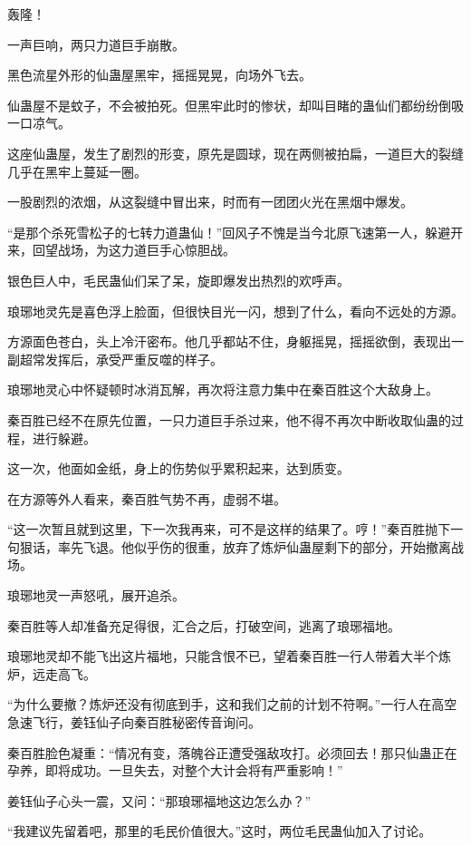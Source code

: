 \begin{this_body}
轰隆！

一声巨响，两只力道巨手崩散。

黑色流星外形的仙蛊屋黑牢，摇摇晃晃，向场外飞去。

仙蛊屋不是蚊子，不会被拍死。但黑牢此时的惨状，却叫目睹的蛊仙们都纷纷倒吸一口凉气。

这座仙蛊屋，发生了剧烈的形变，原先是圆球，现在两侧被拍扁，一道巨大的裂缝几乎在黑牢上蔓延一圈。

一股剧烈的浓烟，从这裂缝中冒出来，时而有一团团火光在黑烟中爆发。

“是那个杀死雪松子的七转力道蛊仙！”回风子不愧是当今北原飞速第一人，躲避开来，回望战场，为这力道巨手心惊胆战。

银色巨人中，毛民蛊仙们呆了呆，旋即爆发出热烈的欢呼声。

琅琊地灵先是喜色浮上脸面，但很快目光一闪，想到了什么，看向不远处的方源。

方源面色苍白，头上冷汗密布。他几乎都站不住，身躯摇晃，摇摇欲倒，表现出一副超常发挥后，承受严重反噬的样子。

琅琊地灵心中怀疑顿时冰消瓦解，再次将注意力集中在秦百胜这个大敌身上。

秦百胜已经不在原先位置，一只力道巨手杀过来，他不得不再次中断收取仙蛊的过程，进行躲避。

这一次，他面如金纸，身上的伤势似乎累积起来，达到质变。

在方源等外人看来，秦百胜气势不再，虚弱不堪。

“这一次暂且就到这里，下一次我再来，可不是这样的结果了。哼！”秦百胜抛下一句狠话，率先飞退。他似乎伤的很重，放弃了炼炉仙蛊屋剩下的部分，开始撤离战场。

琅琊地灵一声怒吼，展开追杀。

秦百胜等人却准备充足得很，汇合之后，打破空间，逃离了琅琊福地。

琅琊地灵却不能飞出这片福地，只能含恨不已，望着秦百胜一行人带着大半个炼炉，远走高飞。

“为什么要撤？炼炉还没有彻底到手，这和我们之前的计划不符啊。”一行人在高空急速飞行，姜钰仙子向秦百胜秘密传音询问。

秦百胜脸色凝重：“情况有变，落魄谷正遭受强敌攻打。必须回去！那只仙蛊正在孕养，即将成功。一旦失去，对整个大计会将有严重影响！”

姜钰仙子心头一震，又问：“那琅琊福地这边怎么办？”

“我建议先留着吧，那里的毛民价值很大。”这时，两位毛民蛊仙加入了讨论。


\end{this_body}
